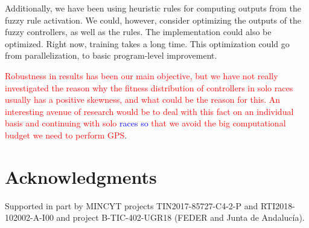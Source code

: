 \documentclass[10pt,journal,compsoc]{IEEEtran}
\begin{document}
Additionally, we have been using heuristic rules for computing outputs
from the fuzzy rule activation. We could, however, consider optimizing
the outputs of the fuzzy controllers, as well as the rules. The implementation could also be optimized. Right now, training takes
a long time. This optimization could go from parallelization, to basic
program-level improvement.

\textcolor{red}{Robustness in results has been our main objective, but
  we have not really investigated the reason why the fitness
  distribution of controllers in solo races usually has a positive
  skewness, and what could be the reason for this. An interesting
  avenue of research would be to deal with this fact on an individual
  basis and continuing with solo \textcolor{blue}{races so} that we avoid the big   computational budget we need to perform GPS}.

\section*{Acknowledgments}

Supported in part by MINCYT projects
TIN2017-85727-C4-2-P and  RTI2018-102002-A-I00 and project
B-TIC-402-UGR18 (FEDER and Junta de Andaluc\'{i}a).












\end{document}
